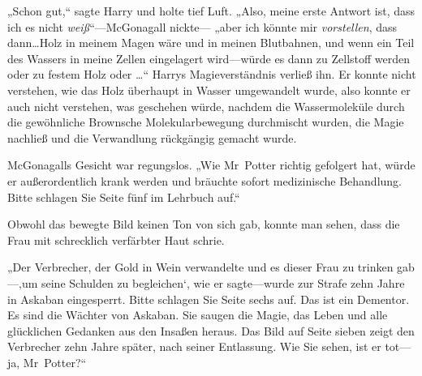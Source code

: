 „Schon gut,“ sagte Harry und holte tief Luft. „Also, meine erste Antwort ist, dass ich es nicht \emph{weiß}“—McGonagall nickte— „aber ich könnte mir \emph{vorstellen}, dass dann…Holz in meinem Magen wäre und in meinen Blutbahnen, und wenn ein Teil des Wassers in meine Zellen eingelagert wird—würde es dann zu Zellstoff werden oder zu festem Holz oder …“ Harrys Magieverständnis verließ ihn. Er konnte nicht verstehen, wie das Holz überhaupt in Wasser umgewandelt wurde, also konnte er auch nicht verstehen, was geschehen würde, nachdem die Wassermoleküle durch die gewöhnliche Brownsche Molekularbewegung durchmischt wurden, die Magie nachließ und die Verwandlung rückgängig gemacht wurde.

McGonagalls Gesicht war regungslos. „Wie Mr~Potter richtig gefolgert hat, würde er außerordentlich krank werden und bräuchte sofort medizinische Behandlung. Bitte schlagen Sie Seite fünf im Lehrbuch auf.“

Obwohl das bewegte Bild keinen Ton von sich gab, konnte man sehen, dass die Frau mit schrecklich verfärbter Haut schrie.

„Der Verbrecher, der Gold in Wein verwandelte und es dieser Frau zu trinken gab—‚um seine Schulden zu begleichen‘, wie er sagte—wurde zur Strafe zehn Jahre in Askaban eingesperrt. Bitte schlagen Sie Seite sechs auf. Das ist ein Dementor. Es sind die Wächter von Askaban. Sie saugen die Magie, das Leben und alle glücklichen Gedanken aus den Insaßen heraus. Das Bild auf Seite sieben zeigt den Verbrecher zehn Jahre später, nach seiner Entlassung. Wie Sie sehen, ist er tot—ja, Mr~Potter?“

